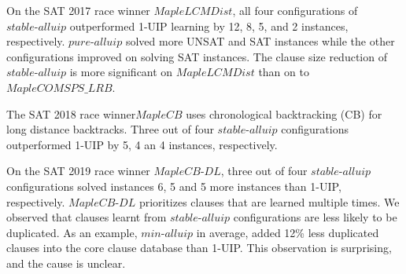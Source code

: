 \documentclass[runningheads]{llncs}
\newcommand{\oneuip}{1-UIP\xspace}
\newcommand{\stablealluip}{\textit{stable-alluip}\xspace}
\newcommand{\allUipPure}{\textit{pure-alluip}\xspace}
\newcommand{\allUipMin}{\textit{min-alluip}\xspace}
\newcommand{\MapleBase}{\textit{MapleCOMSPS\_LRB}}
\newcommand{\MapleSeven}{\textit{MapleLCMDist}}
\newcommand{\MapleNineShort}{\textit{MapleCB-DL} }
\newcommand{\MapleEightShort}{\textit{MapleCB}}
\begin{document}
On the SAT 2017 race winner $\MapleSeven$, all four configurations of
$\stablealluip$ outperformed \oneuip learning by 12, 8, 5, and 2 instances,
respectively. $\allUipPure$ solved more UNSAT and SAT instances while
the other configurations improved on solving SAT instances. The clause
size reduction of $\stablealluip$ is more significant on $\MapleSeven$
than on to $\MapleBase$.

The SAT 2018 race winner$\MapleEightShort$ uses chronological
backtracking (CB) for long distance backtracks. Three out of four
$\stablealluip$ configurations outperformed \oneuip by 5, 4 an 4 instances,
respectively.


On the SAT 2019 race winner $\MapleNineShort$, three out of four
$\stablealluip$ configurations solved instances 6, 5 and 5 more instances
than \oneuip, respectively. $\MapleNineShort$ prioritizes clauses that
are learned multiple times. We observed that clauses learnt from
$\stablealluip$ configurations are less likely to be duplicated. As an
example, $\allUipMin$ in average, added 12\% less duplicated clauses
into the core clause database than \oneuip. This observation is
surprising, and the cause is unclear.

\end{document}
